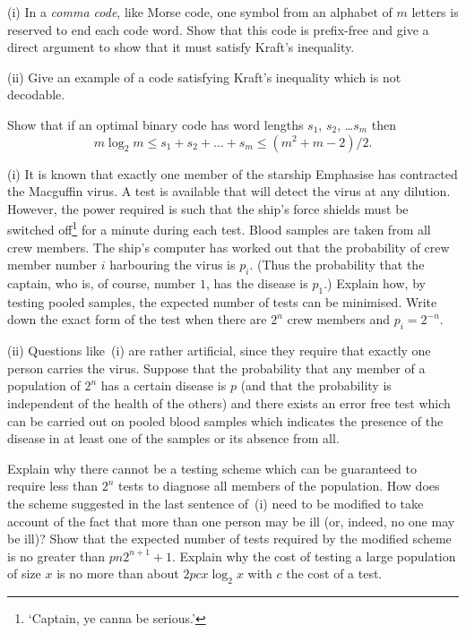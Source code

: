 \begin{question}\label{C1.9} 
(i) In a \emph{comma code}, like
Morse code, one symbol from an alphabet of $m$ letters 
is reserved to end each code word. Show that
this code is prefix-free and give a direct
argument to show that it must satisfy Kraft's inequality.

(ii) Give an example of a code satisfying Kraft's inequality which 
is not decodable.
\end{question}
\begin{question}\label{C1.10} 
Show that if an optimal binary code has
word lengths $s_{1}$, $s_{2}$, \dots $s_{m}$ then
\[m\log_{2} m\leq s_{1}+s_{2}+\dots+s_{m}\leq (m^{2}+m-2)/2.\]
\end{question}
\begin{question}\label{C1.11} (i) It is known that 
exactly one member of the
starship Emphasise has contracted the Macguffin virus.
A test is available that will detect the virus at any dilution.
However, the power required is such that the ship's
force shields
must be switched off\footnote{`Captain, ye canna be serious.'}
for a minute during each test. Blood samples are taken
from all crew members. The ship's computer has worked
out that the probability of crew member number $i$
harbouring the virus is $p_{i}$. (Thus the probability that
the captain, who is, of course, number $1$, has the disease
is $p_{1}$.)   
Explain how, 
by testing pooled
samples, the expected number of tests can be minimised.
Write down the exact form of the test when there are $2^{n}$ 
crew members and $p_{i}=2^{-n}$.

(ii) Questions like~(i) are rather artificial,
since they require that exactly one person carries the virus.
Suppose that the probability that any member of a population
of $2^{n}$ has a certain disease is $p$ (and that
the probability is independent of the health of the others)
and there exists an error free test which can be carried out on pooled
blood samples which indicates the presence of the 
disease in at least one of the samples or its absence from all.

Explain why there cannot be a testing scheme
which can be guaranteed to require less than $2^{n}$
tests to diagnose all members of
the population. How does the scheme suggested
in the last sentence of~(i) need to be modified to take
account of the fact that more than one person 
may be ill (or, indeed, no one may be ill)?
Show that the expected number of tests required by
the modified scheme is no greater than
$pn2^{n+1}+1$. Explain why the cost of testing
a large population of size $x$ is no more than about
$2pcx\log_{2} x$ with $c$ the cost of a test.


\end{question}
